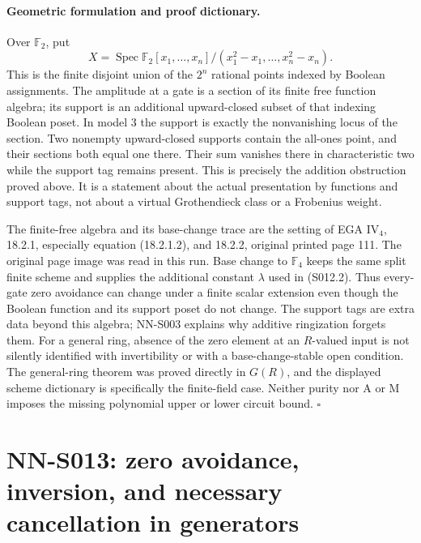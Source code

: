 \paragraph{Geometric formulation and proof dictionary.}
Over $\mathbb F_2$, put
\[
 X=\operatorname{Spec}
 \mathbb F_2[x_1,\ldots,x_n]/(x_1^2-x_1,\ldots,x_n^2-x_n).
\]
This is the finite disjoint union of the $2^n$ rational points indexed
by Boolean assignments. The amplitude at a gate is a section of its
finite free function algebra; its support is an additional upward-closed
subset of that indexing Boolean poset. In model 3 the support is exactly
the nonvanishing locus of the section. Two nonempty upward-closed
supports contain the all-ones point, and their sections both equal one
there. Their sum vanishes there in characteristic two while the support
tag remains present. This is precisely the addition obstruction proved
above. It is a statement about the actual presentation by functions and
support tags, not about a virtual Grothendieck class or a Frobenius weight.

The finite-free algebra and its base-change trace are the setting of
EGA IV$_4$, 18.2.1, especially equation (18.2.1.2), and 18.2.2,
original printed page 111. The original page image was read in this
run. Base change to $\mathbb F_4$ keeps the same split finite scheme
and supplies the additional constant $\lambda$ used in (S012.2).
Thus every-gate zero avoidance can change under a finite scalar
extension even though the Boolean function and its support poset do
not change. The support tags are extra data beyond this algebra;
NN-S003 explains why additive ringization forgets them. For a general
ring, absence of the zero element at an $R$-valued input is not
silently identified with invertibility or with a base-change-stable
open condition. The general-ring theorem was proved directly in
$G(R)$, and the displayed scheme dictionary is specifically the
finite-field case. Neither purity nor A or M imposes the missing
polynomial upper or lower circuit bound.
\hfill$\square$


\section{NN-S013: zero avoidance, inversion, and necessary cancellation in generators}

